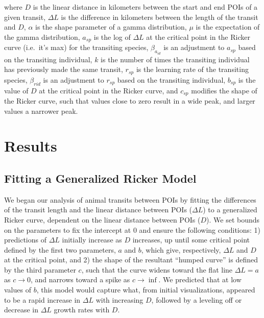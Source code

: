 \documentclass[twoside,12pt,final]{ucthesis-CA2012}
\begin{document}
\begin{ucmainmatter}
where \(D\) is the linear distance in kilometers between the start and end POIs of a given transit, \(\Delta L\) is the difference in kilometers between the length of the transit and \(D\), \(\alpha\) is the shape parameter of a gamma distribution, \(\mu\) is the expectation of the gamma distribution, \(a_{sp}\) is the log of \(\Delta L\) at the critical point in the Ricker curve (i.e.~it's max) for the transiting species, \(\beta_{a_{id}}\) is an adjustment to \(a_{sp}\) based on the transiting individual, \(k\) is the number of times the transiting individual has previously made the same transit, \(r_{sp}\) is the learning rate of the transiting species, \(\beta_{r{id}}\) is an adjustment to \(r_{sp}\) based on the transiting individual, \(b_{sp}\) is the value of \(D\) at the critical point in the Ricker curve, and \(c_{sp}\) modifies the shape of the Ricker curve, such that values close to zero result in a wide peak, and larger values a narrower peak.

\hypertarget{results-2}{%
\section{Results}\label{results-2}}

\hypertarget{fitting-a-generalized-ricker-model}{%
\subsection{Fitting a Generalized Ricker Model}\label{fitting-a-generalized-ricker-model}}

We began our analysis of animal transits between POIs by fitting the differences of the transit length and the linear distance between POIs (\(\Delta L\)) to a generalized Ricker curve, dependent on the linear distance between POIs (\(D\)). We set bounds on the parameters to fix the intercept at 0 and ensure the following conditions: 1) predictions of \(\Delta L\) initially increase as \(D\) increases, up until some critical point defined by the first two parameters, \(a\) and \(b\), which give, respectively, \(\Delta L\) and \(D\) at the critical point, and 2) the shape of the resultant ``humped curve'' is defined by the third parameter \(c\), such that the curve widens toward the flat line \(\Delta L = a\) as \(c \to 0\), and narrows toward a spike as \(c \to \inf\). We predicted that at low values of \(b\), this model would capture what, from initial visualizations, appeared to be a rapid increase in \(\Delta L\) with increasing \(D\), followed by a leveling off or decrease in \(\Delta L\) growth rates with \(D\).


\end{ucmainmatter}
\end{document}
